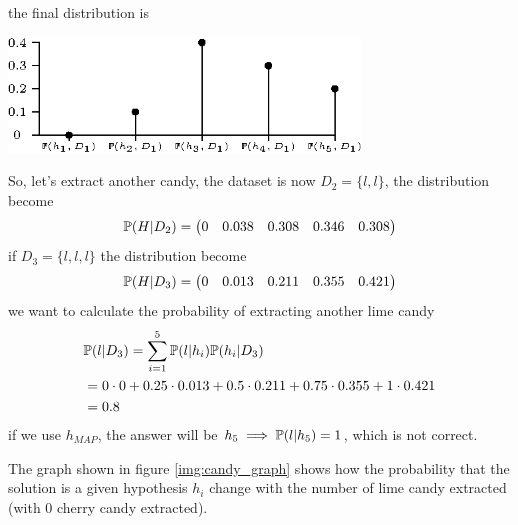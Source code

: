 \documentclass[10pt, letterpaper]{report}
\begin{document}
the final distribution is
\begin{center}
	\includegraphics[width=0.7\textwidth]{images/distr_candy.eps}
\end{center}
So, let's extract another candy, the dataset is now $D_2=\{l,l\}$, the distribution become\begin{equation}
	{\mathbb P}(H|D_2) = \begin{pmatrix}
		0 & 0.038 & 0.308 & 0.346 & 0.308
	\end{pmatrix}
\end{equation}
if $D_3=\{l,l,l\}$ the distribution become\begin{equation}
	{\mathbb P}(H|D_3) = \begin{pmatrix}
		0 & 0.013 & 0.211 & 0.355 & 0.421
	\end{pmatrix}
\end{equation}
we want to calculate the probability of extracting another lime candy\begin{align*}
	 & {\mathbb P}(l|D_3)=\sum_{i=1}^5{\mathbb P}(l|h_i){\mathbb P}(h_i|D_3)                                 \\
	 & = 0 \cdot 0 + 0.25 \cdot 0.013 + 0.5 \cdot 0.211 + 0.75 \cdot 0.355 + 1 \cdot 0.421 \\
	 & =0.8
\end{align*}
if we use $h_{MAP}$, the answer will be $h_5\implies {\mathbb P}(l|h_5)=1$, which is not correct.\bigskip

The graph shown in figure \ref{img:candy_graph} shows how the probability that the solution is a given hypothesis $h_i$ change with the number of lime candy extracted (with 0 cherry candy extracted).
\end{document}
